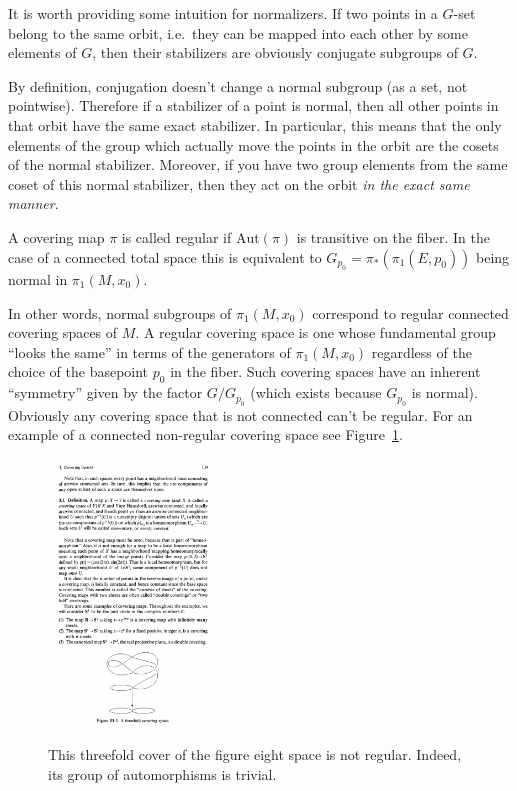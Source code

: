 \begin{rem}
    It is worth providing some intuition for normalizers. If two points in a $G$-set belong to the same orbit, i.e.\ they can be mapped into each other by some elements of $G$, then their stabilizers are obviously conjugate subgroups of $G$.

    By definition, conjugation doesn't change a normal subgroup (as a set, not pointwise). Therefore if a stabilizer of a point is normal, then all other points in that orbit have the same exact stabilizer. In particular, this means that the only elements of the group which actually move the points in the orbit are the cosets of the normal stabilizer. Moreover, if you have two group elements from the same coset of this normal stabilizer, then they act on the orbit \emph{in the exact same manner}.
\end{rem}

\begin{defn}
    A covering map $\pi$ is called regular if $\mathrm{Aut}(\pi)$ is transitive on the fiber. In the case of a connected total space this is equivalent to $G_{p_0}=\pi_\ast(\pi_1(E,p_0))$ being normal in $\pi_1(M,x_0)$.
\end{defn}

In other words, normal subgroups of $\pi_1(M,x_0)$ correspond to regular connected covering spaces of $M$. A regular covering space is one whose fundamental group ``looks the same'' in terms of the generators of $\pi_1(M,x_0)$ regardless of the choice of the basepoint $p_0$ in the fiber. Such covering spaces have an inherent ``symmetry'' given by the factor $G/G_{p_0}$ (which exists because $G_{p_0}$ is normal). Obviously any covering space that is not connected can't be regular. For an example of a connected non-regular covering space see Figure~\ref{fig:threefold-cover}.

\begin{figure}
    \centering
    \includegraphics[width=0.4\textwidth]{figures/threefold_cover.pdf}
    \caption{This threefold cover of the figure eight space is not regular. Indeed, its group of automorphisms is trivial.}
    \label{fig:threefold-cover}
\end{figure}

